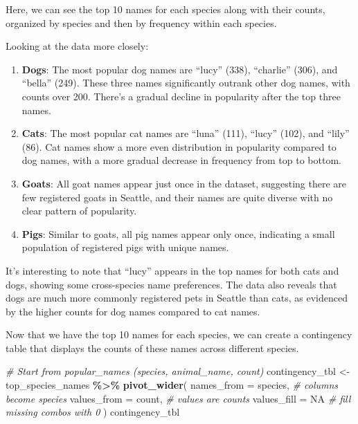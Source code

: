 \documentclass[
]{article}
\newenvironment{Shaded}{\begin{snugshade}}{\end{snugshade}}
\newcommand{\AttributeTok}[1]{\textcolor[rgb]{0.13,0.29,0.53}{#1}}
\newcommand{\CommentTok}[1]{\textcolor[rgb]{0.56,0.35,0.01}{\textit{#1}}}
\newcommand{\ConstantTok}[1]{\textcolor[rgb]{0.56,0.35,0.01}{#1}}
\newcommand{\FunctionTok}[1]{\textcolor[rgb]{0.13,0.29,0.53}{\textbf{#1}}}
\newcommand{\NormalTok}[1]{#1}
\newcommand{\OtherTok}[1]{\textcolor[rgb]{0.56,0.35,0.01}{#1}}
\newcommand{\SpecialCharTok}[1]{\textcolor[rgb]{0.81,0.36,0.00}{\textbf{#1}}}
\begin{document}
Here, we can see the top 10 names for each species along with their
counts, organized by species and then by frequency within each species.

Looking at the data more closely:

\begin{enumerate}
\def\labelenumi{\arabic{enumi}.}
\item
  \textbf{Dogs}: The most popular dog names are ``lucy'' (338),
  ``charlie'' (306), and ``bella'' (249). These three names
  significantly outrank other dog names, with counts over 200. There's a
  gradual decline in popularity after the top three names.
\item
  \textbf{Cats}: The most popular cat names are ``luna'' (111), ``lucy''
  (102), and ``lily'' (86). Cat names show a more even distribution in
  popularity compared to dog names, with a more gradual decrease in
  frequency from top to bottom.
\item
  \textbf{Goats}: All goat names appear just once in the dataset,
  suggesting there are few registered goats in Seattle, and their names
  are quite diverse with no clear pattern of popularity.
\item
  \textbf{Pigs}: Similar to goats, all pig names appear only once,
  indicating a small population of registered pigs with unique names.
\end{enumerate}

It's interesting to note that ``lucy'' appears in the top names for both
cats and dogs, showing some cross-species name preferences. The data
also reveals that dogs are much more commonly registered pets in Seattle
than cats, as evidenced by the higher counts for dog names compared to
cat names.

Now that we have the top 10 names for each species, we can create a
contingency table that displays the counts of these names across
different species.

\begin{Shaded}
\begin{Highlighting}[]
\CommentTok{\# Start from popular\_names (species, animal\_name, count)}
\NormalTok{contingency\_tbl }\OtherTok{\textless{}{-}}\NormalTok{ top\_species\_names }\SpecialCharTok{\%\textgreater{}\%}
  \FunctionTok{pivot\_wider}\NormalTok{(}
    \AttributeTok{names\_from =}\NormalTok{ species, }\CommentTok{\# columns become species}
    \AttributeTok{values\_from =}\NormalTok{ count, }\CommentTok{\# values are counts}
    \AttributeTok{values\_fill =} \ConstantTok{NA} \CommentTok{\# fill missing combos with 0}
\NormalTok{  )}
\NormalTok{contingency\_tbl}
\end{Highlighting}
\end{Shaded}
\end{document}
